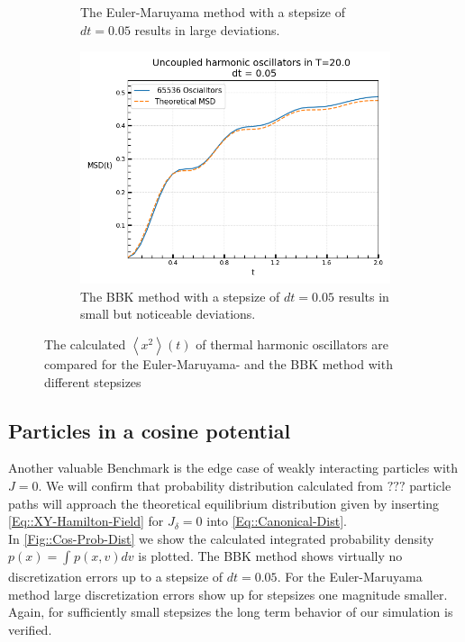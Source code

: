 \begin{figure}[htp]
\begin{subfigure}{0.5\textwidth}
			\caption{The Euler-Maruyama method with a stepsize of $dt=0.05$ results in large deviations.}
		\end{subfigure}
		\begin{subfigure}{0.5\textwidth}
			\centering
			\includegraphics[width=0.8\linewidth]{graphics/MSD-BBK-0.05.png}
			\caption{The BBK method with a stepsize of $dt=0.05$ results in small but noticeable deviations.}
		\end{subfigure}
		\caption{The calculated $\left \langle x^2 \right \rangle (t)$ of thermal harmonic oscillators are compared for the Euler-Maruyama- and the BBK method with different stepsizes}
		\label{Fig::MSD-Comparison}
	\end{figure}
	
	\subsection{Particles in a cosine potential}
	Another valuable Benchmark is the edge case of weakly interacting particles with $J=0$. We will confirm that probability distribution calculated from  $???$ particle paths will approach the theoretical equilibrium distribution given by inserting \autoref{Eq::XY-Hamilton-Field} for $J_\delta =	0$ into \autoref{Eq::Canonical-Dist}. \\
	
	In \autoref{Fig::Cos-Prob-Dist} we show the calculated integrated probability density $p(x) =	\int_{}^{} p(x, v) dv$ is plotted. The BBK method shows virtually no discretization errors up to a stepsize of $dt =	0.05$. For the Euler-Maruyama method large discretization errors show up for stepsizes one magnitude smaller. \\
	
	Again, for sufficiently small stepsizes the long term behavior of our simulation is  verified. 
	

